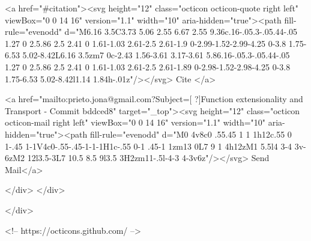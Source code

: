       <a  href="#citation"><svg height="12" class="octicon octicon-quote right left" viewBox="0 0 14 16" version="1.1" width="10" aria-hidden="true"><path fill-rule="evenodd" d="M6.16 3.5C3.73 5.06 2.55 6.67 2.55 9.36c.16-.05.3-.05.44-.05 1.27 0 2.5.86 2.5 2.41 0 1.61-1.03 2.61-2.5 2.61-1.9 0-2.99-1.52-2.99-4.25 0-3.8 1.75-6.53 5.02-8.42L6.16 3.5zm7 0c-2.43 1.56-3.61 3.17-3.61 5.86.16-.05.3-.05.44-.05 1.27 0 2.5.86 2.5 2.41 0 1.61-1.03 2.61-2.5 2.61-1.89 0-2.98-1.52-2.98-4.25 0-3.8 1.75-6.53 5.02-8.42l1.14 1.84h-.01z"/></svg> Cite
      </a>

      <a href="mailto:prieto.jona@gmail.com?Subject=[ ?]Function extensionality and Transport - Commit bddced8" target="_top"><svg height="12" class="octicon octicon-mail right left" viewBox="0 0 14 16" version="1.1" width="10" aria-hidden="true"><path fill-rule="evenodd" d="M0 4v8c0 .55.45 1 1 1h12c.55 0 1-.45 1-1V4c0-.55-.45-1-1-1H1c-.55 0-1 .45-1 1zm13 0L7 9 1 4h12zM1 5.5l4 3-4 3v-6zM2 12l3.5-3L7 10.5 8.5 9l3.5 3H2zm11-.5l-4-3 4-3v6z"/></svg> Send Mail</a>

    </div>
  </div>

</div>

<!-- https://octicons.github.com/ -->





